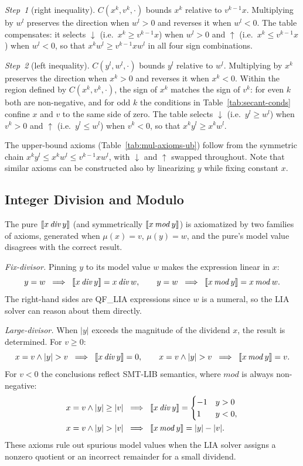 \emph{Step~1} (right inequality).
$\mathit{C}(x^k,v^k,{\cdot})$ bounds $x^k$ relative to $v^{k-1}x$.
Multiplying by $w^l$ preserves the direction when $w^l>0$ and reverses it when $w^l<0$.
The table compensates: it selects $\downarrow$ (i.e.\ $x^k \geq v^{k-1}x$) when $w^l>0$
and $\uparrow$ (i.e.\ $x^k \leq v^{k-1}x$) when $w^l<0$,
so that $x^k w^l \geq v^{k-1}x w^l$ in all four sign combinations.

\emph{Step~2} (left inequality).
$\mathit{C}(y^l,w^l,{\cdot})$ bounds $y^l$ relative to $w^l$.
Multiplying by $x^k$ preserves the direction when $x^k>0$ and reverses it when $x^k<0$.
Within the region defined by $\mathit{C}(x^k,v^k,{\cdot})$, the sign of $x^k$ matches the sign of $v^k$:
for even $k$ both are non-negative, and for odd $k$ the conditions in Table~\ref{tab:secant-conds}
confine $x$ and $v$ to the same side of zero.
The table selects $\downarrow$ (i.e.\ $y^l \geq w^l$) when $v^k>0$
and $\uparrow$ (i.e.\ $y^l \leq w^l$) when $v^k<0$,
so that $x^k y^l \geq x^k w^l$.

The upper-bound axioms (Table~\ref{tab:mul-axioms-ub}) follow from the symmetric chain
$x^k y^l \leq x^k w^l \leq v^{k-1}x w^l$,
with $\downarrow$ and $\uparrow$ swapped throughout. Note that similar axioms can be
constructed also by linearizing $y$ while fixing constant $x$.

\subsection{Integer Division and Modulo}

The pure $\llbracket x \,\mathit{div}\, y \rrbracket$ (and symmetrically $\llbracket x \,\mathit{mod}\, y \rrbracket$) is
axiomatized by two families of axioms, generated when $\mu(x) = v$, $\mu(y) = w$, and the
pure's model value disagrees with the correct result.

\emph{Fix-divisor.}
Pinning $y$ to its model value $w$ makes the expression linear in $x$:
\[
  y = w \;\implies\; \llbracket x \,\mathit{div}\, y \rrbracket = x \,\mathit{div}\, w,
  \qquad
  y = w \;\implies\; \llbracket x \,\mathit{mod}\, y \rrbracket = x \,\mathit{mod}\, w.
\]
The right-hand sides are QF\_LIA expressions since $w$ is a numeral, so the LIA solver can
reason about them directly.

\emph{Large-divisor.}
When $|y|$ exceeds the magnitude of the dividend $x$, the result is determined.
For $v \geq 0$:
\[
  x = v \land |y| > v \;\implies\; \llbracket x \,\mathit{div}\, y \rrbracket = 0,
  \qquad
  x = v \land |y| > v \;\implies\; \llbracket x \,\mathit{mod}\, y \rrbracket = v.
\]
For $v < 0$ the conclusions reflect SMT-LIB semantics, where $\mathit{mod}$ is always
non-negative:
\begin{align*}
  x = v \land |y| \geq |v| &\;\implies\; \llbracket x \,\mathit{div}\, y \rrbracket = \begin{cases} -1 & y > 0 \\ 1 & y < 0, \end{cases} \\
  x = v \land |y| > |v| &\;\implies\; \llbracket x \,\mathit{mod}\, y \rrbracket = |y| - |v|.
\end{align*}
These axioms rule out spurious model values when the LIA solver assigns a nonzero quotient
or an incorrect remainder for a small dividend.
